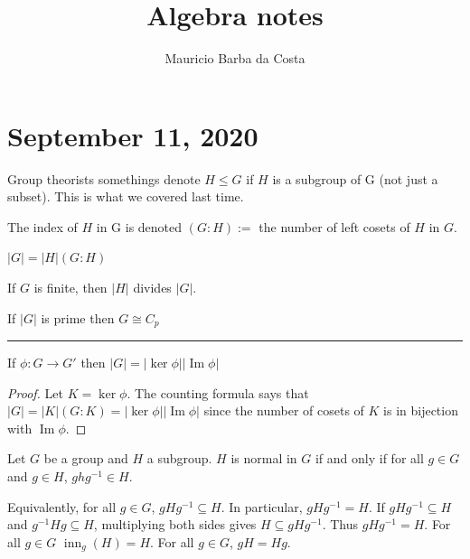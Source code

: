 \documentclass{article}
\title{Algebra notes}
\author{Mauricio Barba da Costa}
\renewcommand{\Im}{\operatorname{Im}}
\newcommand{\ra}[1][]{\xrightarrow{#1}}
\DeclareMathOperator{\inn}{inn}
\begin{document}
\maketitle

\section{September 11, 2020}
Group theorists somethings denote $H\leq G$ if $H$ is a subgroup of G (not just a subset). This is what we covered last time.
\begin{definition}
    The index of $H$ in G is denoted $(G:H):=$ the number of left cosets of $H$ in $G$.
\end{definition}
\begin{theorem}
    $|G|=|H|(G:H)$
\end{theorem}
\begin{corollary}
If $G$ is finite, then $|H|$ divides $|G|$.
\end{corollary}
\begin{corollary}
If $|G|$ is prime then $G\cong C_p$
\end{corollary}
\hrule
\begin{corollary}
If $\phi:G\ra{} G'$ then $|G|=|\ker\phi||\Im\phi|$
\end{corollary}
\begin{proof}
Let $K=\ker\phi$. The counting formula says that $|G|=|K|(G:K)=|\ker\phi||\Im\phi|$ since the number of cosets of $K$ is in bijection with $\Im\phi$. 
\end{proof}
\begin{definition}
    Let $G$ be a group and $H$ a subgroup. $H$ is normal in $G$ if and only if for all $g\in G$ and $g\in H$, $ghg^{-1}\in H$. 
\end{definition}
Equivalently, for all $g\in G$, $gHg^{-1}\subseteq H$. In particular, $gHg^{-1}=H$. If $gHg^{-1}\subseteq H$ and $g^{-1}Hg\subseteq H$, multiplying both sides gives $H\subseteq gHg^{-1}$. Thus $gHg^{-1}=H$. For all $g\in G$ $\inn_g(H)=H$. For all $g\in G$, $gH=Hg$. 
\end{document}
